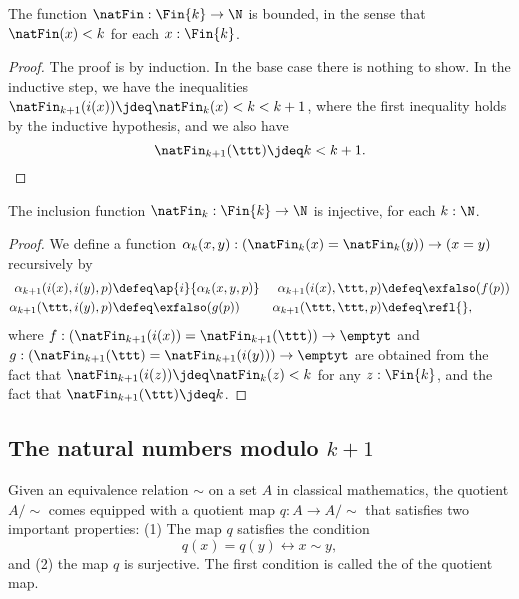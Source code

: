 \begin{lem}\label{lem:is-bounded-natFin}
  The function $\natFin:\Fin{k}\to\N$ is bounded, in the sense that $\natFin(x)< k$ for each $x:\Fin{k}$.
\end{lem}

\begin{proof}
  The proof is by induction. In the base case there is nothing to show. In the inductive step, we have the inequalities $\natFin_{k+1}(i(x))\jdeq\natFin_{k}(x)<k<k+1$, where the first inequality holds by the inductive hypothesis, and we also have
  \begin{equation*}
    \natFin_{k+1}(\ttt)\jdeq k<k+1.\qedhere
  \end{equation*}
\end{proof}

\begin{prp}\label{prp:is-injective-natFin}
  The inclusion function $\natFin_k : \Fin{k}\to \N$ is injective, for each $k:\N$.
\end{prp}

\begin{proof}
  We define a function $\alpha_k(x,y):(\natFin_k(x)=\natFin_k(y))\to (x=y)$ recursively by
  \begin{align*}
    \alpha_{k+1}(i(x),i(y),p) & \defeq \ap{i}{\alpha_k(x,y,p)} & \alpha_{k+1}(i(x),\ttt,p) & \defeq \exfalso(f(p)) \\
    \alpha_{k+1}(\ttt,i(y),p) & \defeq \exfalso(g(p)) & \alpha_{k+1}(\ttt,\ttt,p) & \defeq \refl{},
  \end{align*}
  where $f:(\natFin_{k+1}(i(x))=\natFin_{k+1}(\ttt))\to\emptyt$ and $g:(\natFin_{k+1}(\ttt)=\natFin_{k+1}(i(y)))\to\emptyt$ are obtained from the fact that $\natFin_{k+1}(i(z))\jdeq\natFin_k(z)<k$ for any $z:\Fin{k}$, and the fact that $\natFin_{k+1}(\ttt)\jdeq k$.
\end{proof}

\subsection{The natural numbers modulo \texorpdfstring{$k+1$}{k+1}}\label{subsec:finite-types-quotient-maps}

Given an equivalence relation $\sim$ on a set $A$ in classical mathematics, the quotient $A/{\sim}$ comes equipped with a quotient map $q:A\to A/{\sim}$ that satisfies two important properties: (1) The map $q$ satisfies the condition
\begin{equation*}
  q(x)=q(y)\leftrightarrow x\sim y,
\end{equation*}
and (2) the map $q$ is surjective. The first condition is called the  of the quotient map.

